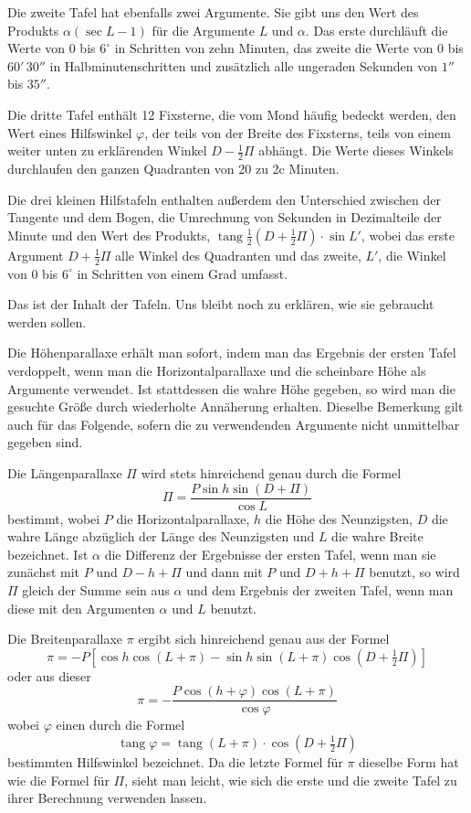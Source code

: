Die zweite Tafel hat ebenfalls zwei Argumente. Sie gibt uns den Wert des Produkts $\alpha(\sec L - 1)$ für die Argumente $L$ und $\alpha$. Das erste durchläuft die Werte von 0 bis $6^{\circ}$ in Schritten von zehn Minuten, das zweite die Werte von 0 bis $60'\,30''$ in Halbminutenschritten und zusätzlich alle ungeraden Sekunden von $1''$ bis $35''$.

Die dritte Tafel enthält 12 Fixsterne, die vom Mond häufig bedeckt werden, den Wert eines Hilfswinkel $\varphi$, der teils von der Breite des Fixsterns, teils von einem weiter unten zu erklärenden Winkel $D - \tfrac{1}{2}\Pi$ abhängt. Die Werte dieses Winkels durchlaufen den ganzen Quadranten von 20 zu 2c Minuten.

Die drei kleinen Hilfstafeln enthalten außerdem den Unterschied zwischen der Tangente und dem Bogen, die Umrechnung von Sekunden in Dezimalteile der Minute und den Wert des Produkts, $\operatorname{tang} \tfrac{1}{2}(D+\tfrac{1}{2}\Pi)\cdot\sin L'$, wobei das erste Argument $D+\tfrac{1}{2}\Pi$ alle Winkel des Quadranten und das zweite, $L'$, die Winkel von 0 bis $6^{\circ}$ in Schritten von einem Grad umfasst.

Das ist der Inhalt der Tafeln. Uns bleibt noch zu erklären, wie sie gebraucht werden sollen.

Die Höhenparallaxe erhält man sofort, indem man das Ergebnis der ersten Tafel verdoppelt, wenn man die Horizontalparallaxe und die scheinbare Höhe als Argumente verwendet. Ist stattdessen die wahre Höhe gegeben, so wird man die gesuchte Größe durch wiederholte Annäherung erhalten. Dieselbe Bemerkung gilt auch für das Folgende, sofern die zu verwendenden Argumente nicht unmittelbar gegeben sind.

Die Längenparallaxe $\Pi$ wird stets hinreichend genau durch die Formel
\[
\Pi = \dfrac{P \sin h \sin(D+\Pi)}{\cos L}
\]
bestimmt, wobei $P$ die Horizontalparallaxe, $h$ die Höhe des Neunzigsten, $D$ die wahre Länge abzüglich der Länge des Neunzigsten und $L$ die wahre Breite bezeichnet. Ist $\alpha$ die Differenz der Ergebnisse der ersten Tafel, wenn man sie zunächst mit $P$ und $D-h+\Pi$ und dann mit $P$ und $D+h+\Pi$ benutzt, so wird $\Pi$ gleich der Summe sein aus $\alpha$ und dem Ergebnis der zweiten Tafel, wenn man diese mit den Argumenten $\alpha$ und $L$ benutzt.

Die Breitenparallaxe $\pi$ ergibt sich hinreichend genau aus der Formel
\[
\pi = -P[\cos h \cos(L+\pi) - \sin h \sin(L+\pi)\cos(D+\tfrac{1}{2}\Pi)]
\]
oder aus dieser
\[
\pi = -\dfrac{P\cos(h+\varphi)\cos(L+\pi)}{\cos\varphi}
\]
wobei $\varphi$ einen durch die Formel
\[
\operatorname{tang} \varphi = \operatorname{tang}(L+\pi)\cdot\cos(D+\tfrac{1}{2}\Pi)
\]
bestimmten Hilfswinkel bezeichnet. Da die letzte Formel für $\pi$ dieselbe Form hat wie die Formel für $\Pi$, sieht man leicht, wie sich die erste und die zweite Tafel zu ihrer Berechnung verwenden lassen.

